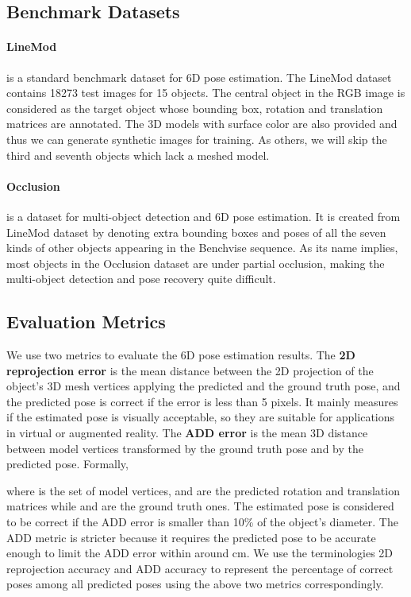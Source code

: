 \documentclass[10pt,twocolumn,letterpaper]{article}
\begin{document}
\subsection{Benchmark Datasets}
\paragraph{LineMod \cite{Hinterstoisser:2012:MBT:2481913.2481959}} is a standard benchmark dataset for 6D pose estimation. The LineMod dataset contains 18273 test images for 15 objects. The central object in the RGB image is considered as the target object whose bounding box, rotation and translation matrices are annotated. The 3D models with surface color are also provided and thus we can generate synthetic images for training. As others, we will skip the third and seventh objects which lack a meshed model.
\paragraph{Occlusion \cite{10.1007/978-3-319-10605-2_35}}
is a dataset for multi-object detection and 6D pose estimation. It is created from LineMod dataset by denoting extra bounding boxes and poses of all the seven kinds of other objects appearing in the Benchvise sequence. As its name implies, most objects in the Occlusion dataset are under partial occlusion, making the multi-object detection and pose recovery quite difficult.

\subsection{Evaluation Metrics}
We use two metrics to evaluate the 6D pose estimation results. The \textbf{2D reprojection error} \cite{7780735} is the mean distance between the 2D projection of the object's 3D mesh vertices applying the predicted and the ground truth pose, and the predicted pose is correct if the error is less than 5 pixels. It mainly measures if the estimated pose is visually acceptable, so they are suitable for applications in virtual or augmented reality. The \textbf{ADD error} \cite{Hinterstoisser:2012:MBT:2481913.2481959} is the mean 3D distance between model vertices transformed by the ground truth pose and by the predicted pose. Formally,

where  is the set of model vertices,  and  are the predicted rotation and translation matrices while  and  are the ground truth ones. The estimated pose is considered to be correct if the ADD error is smaller than 10\% of the object's diameter. The ADD metric is stricter because it requires the predicted pose to be accurate enough to limit the ADD error within around  cm. We use the terminologies 2D reprojection accuracy and ADD accuracy to represent the percentage of correct poses among all predicted poses using the above two metrics correspondingly.
\end{document}
